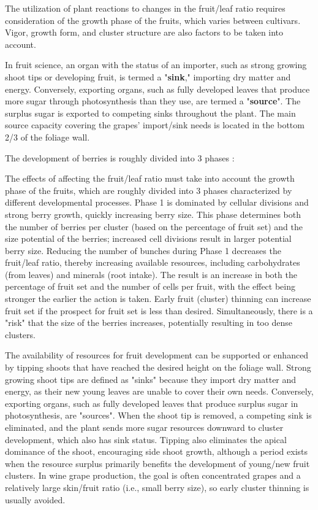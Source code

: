 The utilization of plant reactions to changes in the fruit/leaf ratio requires consideration of the growth phase of the fruits, which varies between cultivars. Vigor, growth form, and cluster structure are also factors to be taken into account.

In fruit science, an organ with the status of an importer, such as strong growing shoot tips or developing fruit, is termed a "\textbf{sink}," importing dry matter and energy. Conversely, exporting organs, such as fully developed leaves that produce more sugar through photosynthesis than they use, are termed a "\textbf{source}". The surplus sugar is exported to competing sinks throughout the plant. The main source capacity covering the grapes' import/sink needs is located in the bottom 2/3 of the foliage wall.

The development of berries is roughly divided into 3 phases \cite*{rm_05.1_L07_green_harvest_fruit_thinning}:

The effects of affecting the fruit/leaf ratio must take into account the growth phase of the fruits, which are roughly divided into 3 phases characterized by different developmental processes. Phase 1 is dominated by cellular divisions and strong berry growth, quickly increasing berry size. This phase determines both the number of berries per cluster (based on the percentage of fruit set) and the size potential of the berries; increased cell divisions result in larger potential berry size. Reducing the number of bunches during Phase 1 decreases the fruit/leaf ratio, thereby increasing available resources, including carbohydrates (from leaves) and minerals (root intake). The result is an increase in both the percentage of fruit set and the number of cells per fruit, with the effect being stronger the earlier the action is taken. Early fruit (cluster) thinning can increase fruit set if the prospect for fruit set is less than desired. Simultaneously, there is a "risk" that the size of the berries increases, potentially resulting in too dense clusters.

\vspace{0.5em}
The availability of resources for fruit development can be supported or enhanced by tipping shoots that have reached the desired height on the foliage wall. Strong growing shoot tips are defined as "sinks" because they import dry matter and energy, as their new young leaves are unable to cover their own needs. Conversely, exporting organs, such as fully developed leaves that produce surplus sugar in photosynthesis, are "sources". When the shoot tip is removed, a competing sink is eliminated, and the plant sends more sugar resources downward to cluster development, which also has sink status. Tipping also eliminates the apical dominance of the shoot, encouraging side shoot growth, although a period exists when the resource surplus primarily benefits the development of young/new fruit clusters. In wine grape production, the goal is often concentrated grapes and a relatively large skin/fruit ratio (i.e., small berry size), so early cluster thinning is usually avoided.

